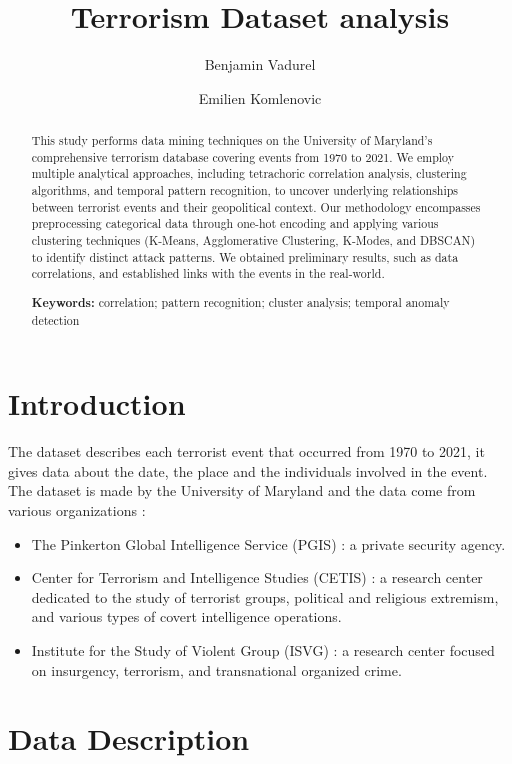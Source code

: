 \documentclass{article}
\author[1]{Benjamin Vadurel}
\author[1]{Emilien Komlenovic}
\affil[1]{Université Claude Bernard Lyon 1}
\title{Terrorism Dataset analysis}
\begin{document}
\maketitle


\begin{abstract}
   This study performs data mining techniques on the University of Maryland's comprehensive terrorism database covering events from 1970 to 2021. We employ multiple analytical approaches, including tetrachoric correlation analysis, clustering algorithms, and temporal pattern recognition, to uncover underlying relationships between terrorist events and their geopolitical context. Our methodology encompasses preprocessing categorical data through one-hot encoding and applying various clustering techniques (K-Means, Agglomerative Clustering, K-Modes, and DBSCAN) to identify distinct attack patterns. We obtained preliminary results, such as data correlations, and established links with the events in the real-world.

\textbf{Keywords:} correlation; pattern recognition; cluster analysis; temporal anomaly detection
\end{abstract}
\section{Introduction}

The dataset describes each terrorist event that occurred from 1970 to 2021, it gives data about the date, the place and the individuals involved in the event. The dataset \cite{GTD} is made by the University of Maryland and the data come from various organizations : 
\begin{itemize}
    \item The Pinkerton Global Intelligence Service (PGIS) : a private security agency.
    \item Center for Terrorism and Intelligence Studies (CETIS) :  a research center dedicated to the study of terrorist groups, political and religious extremism, and various types of covert intelligence operations.
    \item Institute for the Study of Violent Group (ISVG) : a research center focused on insurgency, terrorism, and transnational organized crime.
\end{itemize}


\section{Data Description}
\end{document}
